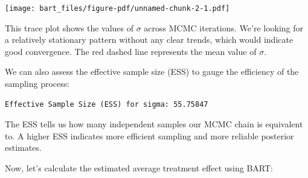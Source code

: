 \documentclass[
  letterpaper,
  DIV=11,
  numbers=noendperiod]{scrreprt}
\newenvironment{Shaded}{\begin{snugshade}}{\end{snugshade}}
\newcommand{\AttributeTok}[1]{\textcolor[rgb]{0.40,0.45,0.13}{#1}}
\newcommand{\CommentTok}[1]{\textcolor[rgb]{0.37,0.37,0.37}{#1}}
\newcommand{\FunctionTok}[1]{\textcolor[rgb]{0.28,0.35,0.67}{#1}}
\newcommand{\NormalTok}[1]{\textcolor[rgb]{0.00,0.23,0.31}{#1}}
\newcommand{\OtherTok}[1]{\textcolor[rgb]{0.00,0.23,0.31}{#1}}
\newcommand{\SpecialCharTok}[1]{\textcolor[rgb]{0.37,0.37,0.37}{#1}}
\newcommand{\StringTok}[1]{\textcolor[rgb]{0.13,0.47,0.30}{#1}}
\begin{document}
\texttt{[image: bart\_files/figure-pdf/unnamed-chunk-2-1.pdf]}

This trace plot shows the values of \(\sigma\) across MCMC iterations.
We're looking for a relatively stationary pattern without any clear
trends, which would indicate good convergence. The red dashed line
represents the mean value of \(\sigma\).

We can also assess the effective sample size (ESS) to gauge the
efficiency of the sampling process:

\begin{Shaded}
\end{Shaded}

\begin{verbatim}
Effective Sample Size (ESS) for sigma: 55.75847 
\end{verbatim}

The ESS tells us how many independent samples our MCMC chain is
equivalent to. A higher ESS indicates more efficient sampling and more
reliable posterior estimates.

Now, let's calculate the estimated average treatment effect using BART:
\end{document}
